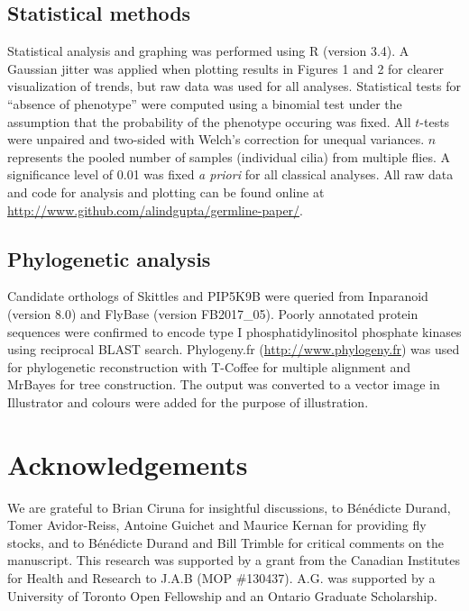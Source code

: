 \documentclass[12pt, twoside, letterpaper]{article}
\begin{document}
\begin{doublespacing}
\begin{linenumbers}
    \subsection*{Statistical methods}
    Statistical analysis and graphing was performed using R (version 3.4).
    A Gaussian jitter was applied when plotting
    results in Figures 1 and 2 for clearer visualization of trends,
    but raw data was used for all analyses.
    Statistical tests for ``absence of phenotype'' were computed using a binomial test
    under the assumption that the probability of the phenotype occuring was fixed.
    All $t$-tests were unpaired and two-sided with Welch's correction for unequal variances.
    $n$ represents the pooled number of samples (individual cilia) from multiple flies.
    A significance level of 0.01 was fixed \textit{a priori} for all classical analyses.
    All raw data and code for analysis and plotting can be found online
    at \url{http://www.github.com/alindgupta/germline-paper/}.

    \subsection*{Phylogenetic analysis}
    Candidate orthologs of Skittles and PIP5K9B were queried
    from Inparanoid (version 8.0) and FlyBase (version FB2017\_05).
    Poorly annotated protein sequences were confirmed
    to encode type I phosphatidylinositol phosphate
    kinases using reciprocal BLAST search.
    Phylogeny.fr (\url{http://www.phylogeny.fr}) \citep{dereeper2008phylogeny} was used for
    phylogenetic reconstruction with T-Coffee for multiple alignment
    and MrBayes for tree construction.
    The output was converted to a vector image in Illustrator
    and colours were added for the purpose of illustration.

    \section*{Acknowledgements}
    We are grateful to Brian Ciruna for insightful discussions,
    to B{\'e}n{\'e}dicte Durand, Tomer Avidor-Reiss, Antoine Guichet and Maurice Kernan for providing
    fly stocks, and to
    B{\'e}n{\'e}dicte Durand and Bill Trimble
    for critical comments on the manuscript.
    This research was supported by a grant from the Canadian Institutes for
    Health and Research to J.A.B (MOP \#130437).
    A.G. was supported by a
    University of Toronto Open Fellowship and
    an Ontario Graduate Scholarship.
    

\end{linenumbers}
\end{doublespacing}
\end{document}
